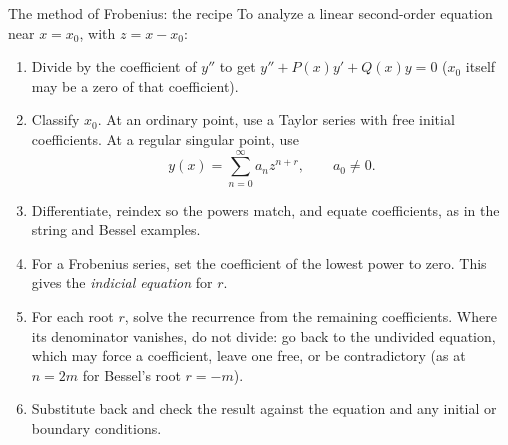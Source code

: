 \documentclass[11pt]{beamer}
\begin{document}
\begin{frame}{The method of Frobenius: the recipe}
\footnotesize
To analyze a linear second-order equation near $x=x_0$, with $z=x-x_0$:
\begin{enumerate}
  \item Divide by the coefficient of $y''$ to get $y''+P(x)y'+Q(x)y=0$ ($x_0$ itself
        may be a zero of that coefficient).
  \item Classify $x_0$. At an ordinary point, use a Taylor series with free
        initial coefficients. At a regular singular point, use
        \[
          y(x)=\sum_{n=0}^{\infty}a_n z^{n+r},\qquad a_0\ne0.
        \]
  \item Differentiate, reindex so the powers match, and equate coefficients, as in the
        string and Bessel examples.
  \item For a Frobenius series, set the coefficient of the lowest power to zero.
        This gives the \emph{indicial equation} for $r$.
  \item For each root $r$, solve the recurrence from the remaining coefficients.  Where
        its denominator vanishes, do not divide: go back to the undivided equation, which
        may force a coefficient, leave one free, or be contradictory (as at $n=2m$ for
        Bessel's root $r=-m$).
  \item Substitute back and check the result against the equation and any initial or
        boundary conditions.
\end{enumerate}
\end{frame}
\end{document}
